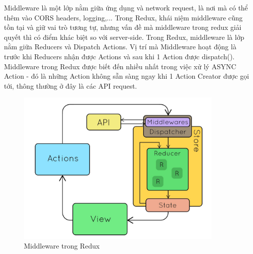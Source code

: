 Middleware là một lớp nằm giữa ứng dụng và network request, là nơi mà có thể thêm vào CORS headers, logging,... Trong Redux, khái niệm middleware cũng tồn tại và giữ vai trò tương tự, nhưng vấn đề mà middleware trong redux giải quyết thì có điểm khác biệt so với server-side. Trong Redux, middleware là lớp nằm giữa Reducers và Dispatch Actions. Vị trí mà Middleware hoạt động là trước khi Reducers nhận được Actions và sau khi 1 Action được dispatch(). Middleware trong Redux được biết đến nhiều nhất trong việc xử lý ASYNC Action - đó là những Action không sẵn sàng ngay khi 1 Action Creator được gọi tới, thông thường ở đây là các API request.
\begin{figure}[h]
\centering
\includegraphics[width=10cm]{image/midleware.jpeg}
\caption{Middleware trong Redux}
\end{figure}
